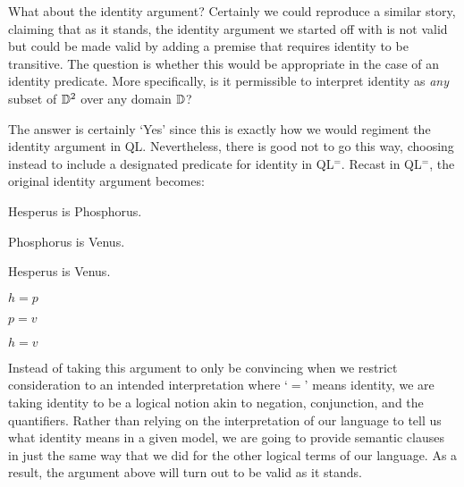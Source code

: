What about the identity argument?
Certainly we could reproduce a similar story, claiming that as it stands, the identity argument we started off with is not valid but could be made valid by adding a premise that requires identity to be transitive.
The question is whether this would be appropriate in the case of an identity predicate.
More specifically, is it permissible to interpret identity as \textit{any} subset of $\mathbb{D}^2$ over any domain $\mathbb{D}$?

The answer is certainly `Yes' since this is exactly how we would regiment the identity argument in QL.
Nevertheless, there is good not to go this way, choosing instead to include a designated predicate for identity in QL$^=$.
Recast in QL$^=$, the original identity argument becomes:

\begin{multicols}{2}
  
\begin{earg}
  \item[] Hesperus is Phosphorus.
  \item[] Phosphorus is Venus.
  \item[\therefore] Hesperus is Venus.
\end{earg}

\begin{earg}
  \item[] $h=p$
  \item[] $p=v$
  \item[\therefore] $h=v$
\end{earg}

\end{multicols}

Instead of taking this argument to only be convincing when we restrict consideration to an intended interpretation where `$=$' means identity, we are taking identity to be a logical notion akin to negation, conjunction, and the quantifiers.
Rather than relying on the interpretation of our language to tell us what identity means in a given model, we are going to provide semantic clauses in just the same way that we did for the other logical terms of our language.
As a result, the argument above will turn out to be valid as it stands.

